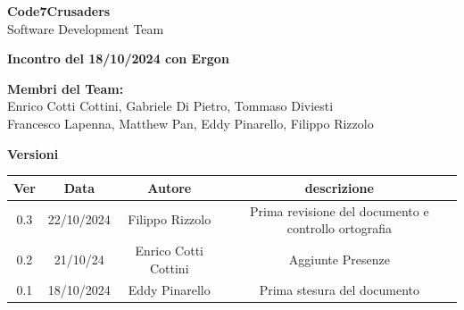 \documentclass{article}
\begin{document}
\begin{titlepage}
    {\Huge \textbf{Code7Crusaders}}\\
    \vspace{0.5cm}
    {\Large Software Development Team}\\
    \vspace{2cm}
    
    {\large \textbf{Incontro del 18/10/2024 con Ergon}}\\
    \vspace{5cm}

    \textbf{Membri del Team:}\\
    Enrico Cotti Cottini, Gabriele Di Pietro, Tommaso Diviesti \\
    Francesco Lapenna, Matthew Pan, Eddy Pinarello, Filippo Rizzolo \\
    \vspace{0.5cm}
    
    \vspace{1cm}
\end{titlepage}

\tableofcontents
\newpage
\begin{center}
    \textbf{Versioni}
    \\
    \begin{tabular}{|c|c|c|c|}
        \hline
        \textbf{Ver} & \textbf{Data} & \textbf{Autore} & \textbf{descrizione}\\
        \hline
        0.3 & 22/10/2024 & Filippo Rizzolo & Prima revisione del documento e controllo ortografia \\ 
        \hline
	    0.2 & 21/10/24 & Enrico Cotti Cottini & Aggiunte Presenze \\
	    \hline
        0.1 & 18/10/2024 & Eddy Pinarello & Prima stesura del documento \\ 
        \hline
    \end{tabular}
\end{center}
\newpage
\end{document}
